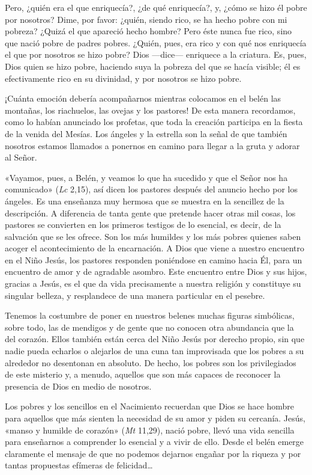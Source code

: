 \documentclass[]{article}
\begin{document}
Pero, ¿quién era el que enriquecía?, ¿de qué enriquecía?, y, ¿cómo se
hizo él pobre por nosotros? Dime, por favor: ¿quién, siendo rico, se ha
hecho pobre con mi pobreza? ¿Quizá el que apareció hecho hombre? Pero
éste nunca fue rico, sino que nació pobre de padres pobres. ¿Quién,
pues, era rico y con qué nos enriquecía el que por nosotros se hizo
pobre? Dios ---dice--- enriquece a la criatura. Es, pues, Dios quien se
hizo pobre, haciendo suya la pobreza del que se hacía visible; él es
efectivamente rico en su divinidad, y por nosotros se hizo pobre.

¡Cuánta emoción debería acompañarnos mientras colocamos en el belén las
montañas, los riachuelos, las ovejas y los pastores! De esta manera
recordamos, como lo habían anunciado los profetas, que toda la creación
participa en la fiesta de la venida del Mesías. Los ángeles y la
estrella son la señal de que también nosotros estamos llamados a
ponernos en camino para llegar a la gruta y adorar al Señor.

«Vayamos, pues, a Belén, y veamos lo que ha sucedido y que el Señor nos
ha comunicado» (\emph{Lc} 2,15), así dicen los pastores después del
anuncio hecho por los ángeles. Es una enseñanza muy hermosa que se
muestra en la sencillez de la descripción. A diferencia de tanta gente
que pretende hacer otras mil cosas, los pastores se convierten en los
primeros testigos de lo esencial, es decir, de la salvación que se les
ofrece. Son los más humildes y los más pobres quienes saben acoger el
acontecimiento de la encarnación. A Dios que viene a nuestro encuentro
en el Niño Jesús, los pastores responden poniéndose en camino hacia Él,
para un encuentro de amor y de agradable asombro. Este encuentro entre
Dios y sus hijos, gracias a Jesús, es el que da vida precisamente a
nuestra religión y constituye su singular belleza, y resplandece de una
manera particular en el pesebre.

Tenemos la costumbre de poner en nuestros belenes muchas figuras
simbólicas, sobre todo, las de mendigos y de gente que no conocen otra
abundancia que la del corazón. Ellos también están cerca del Niño Jesús
por derecho propio, sin que nadie pueda echarlos o alejarlos de una cuna
tan improvisada que los pobres a su alrededor no desentonan en absoluto.
De hecho, los pobres son los privilegiados de este misterio y, a menudo,
aquellos que son más capaces de reconocer la presencia de Dios en medio
de nosotros.

Los pobres y los sencillos en el Nacimiento recuerdan que Dios se hace
hombre para aquellos que más sienten la necesidad de su amor y piden su
cercanía. Jesús, «manso y humilde de corazón» (\emph{Mt} 11,29), nació
pobre, llevó una vida sencilla para enseñarnos a comprender lo esencial
y a vivir de ello. Desde el belén emerge claramente el mensaje de que no
podemos dejarnos engañar por la riqueza y por tantas propuestas efímeras
de felicidad\ldots{}
\end{document}
